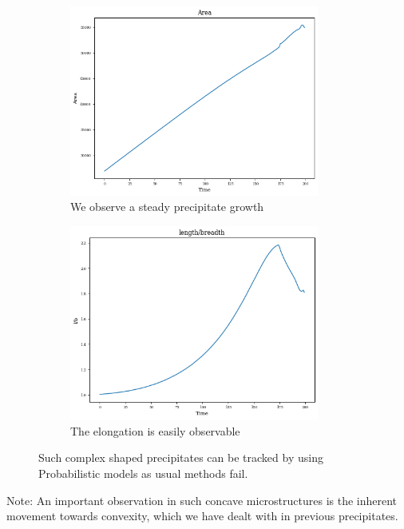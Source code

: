 \documentclass[12pt, a4paper]{report}
\begin{document}
\begin{figure}[H]
\centering
\begin{subfigure}{.45\textwidth}
  \centering
  \includegraphics[width=0.9\textwidth]{Pictures/Results/4area.jpeg}
  \caption{We observe a steady precipitate growth}
  \label{img:microstrImg}
\end{subfigure}
\begin{subfigure}{.45\textwidth}
  \centering
  \includegraphics[width=0.9\textwidth]{Pictures/Results/4lb.jpeg}
  \caption{The elongation is easily observable}
  \label{img:microstrImg}
\end{subfigure}
\caption{Such complex shaped precipitates can be tracked by using Probabilistic models as usual methods fail.}
\label{fig:test}
\end{figure}

Note: An important observation in such concave microstructures is the inherent movement towards convexity, which we have dealt with in previous precipitates.

\end{document}
